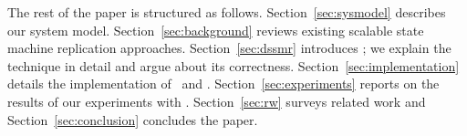 The rest of the paper is structured as follows.
Section~\ref{sec:sysmodel} describes our system model.
Section~\ref{sec:background} reviews existing scalable state machine replication approaches.
Section~\ref{sec:dssmr} introduces \dssmr{}; we explain the technique in detail and argue about its correctness.
Section~\ref{sec:implementation} details the implementation of \libname\ and \appname{}.
Section~\ref{sec:experiments} reports on the results of our experiments with \dssmr{}.
Section~\ref{sec:rw} surveys related work and
Section~\ref{sec:conclusion} concludes the paper.











